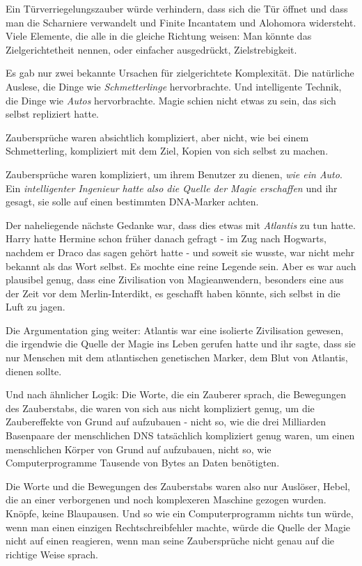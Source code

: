 Ein Türverriegelungszauber würde verhindern, dass sich die Tür öffnet und dass
man die Scharniere verwandelt und Finite Incantatem und Alohomora widersteht.
Viele Elemente, die alle in die gleiche Richtung weisen: Man könnte das
Zielgerichtetheit nennen, oder einfacher ausgedrückt, Zielstrebigkeit.

Es gab nur zwei bekannte Ursachen für zielgerichtete Komplexität. Die natürliche
Auslese, die Dinge wie \emph{Schmetterlinge} hervorbrachte. Und intelligente
Technik, die Dinge wie \emph{Autos} hervorbrachte. Magie schien nicht etwas zu
sein, das sich selbst repliziert hatte.

Zaubersprüche waren absichtlich kompliziert, aber nicht, wie bei einem
Schmetterling, kompliziert mit dem Ziel, Kopien von sich selbst zu machen.

Zaubersprüche waren kompliziert, um ihrem Benutzer zu dienen, \emph{wie ein
Auto}. Ein \emph{intelligenter Ingenieur hatte also die Quelle der Magie
erschaffen} und ihr gesagt, sie solle auf einen bestimmten DNA-Marker achten.

Der naheliegende nächste Gedanke war, dass dies etwas mit \emph{\glqq
Atlantis\grqq{} } zu tun hatte. Harry hatte Hermine schon früher danach gefragt
- im Zug nach Hogwarts, nachdem er Draco das sagen gehört hatte - und soweit sie
wusste, war nicht mehr bekannt als das Wort selbst. Es mochte eine reine Legende
sein. Aber es war auch plausibel genug, dass eine Zivilisation von
Magieanwendern, besonders eine aus der Zeit vor dem Merlin-Interdikt, es
geschafft haben könnte, sich selbst in die Luft zu jagen.

Die Argumentation ging weiter: Atlantis war eine isolierte Zivilisation gewesen,
die irgendwie die Quelle der Magie ins Leben gerufen hatte und ihr sagte, dass
sie nur Menschen mit dem atlantischen genetischen Marker, dem Blut von Atlantis,
dienen sollte.

Und nach ähnlicher Logik: Die Worte, die ein Zauberer sprach, die Bewegungen des
Zauberstabs, die waren von sich aus nicht kompliziert genug, um die
Zaubereffekte von Grund auf aufzubauen - nicht so, wie die drei Milliarden
Basenpaare der menschlichen DNS tatsächlich kompliziert genug waren, um einen
menschlichen Körper von Grund auf aufzubauen, nicht so, wie Computerprogramme
Tausende von Bytes an Daten benötigten.

Die Worte und die Bewegungen des Zauberstabs waren also nur Auslöser, Hebel, die
an einer verborgenen und noch komplexeren Maschine gezogen wurden. Knöpfe, keine
Blaupausen. Und so wie ein Computerprogramm nichts tun würde, wenn man einen
einzigen Rechtschreibfehler machte, würde die Quelle der Magie nicht auf einen
reagieren, wenn man seine Zaubersprüche nicht genau auf die richtige Weise
sprach.

